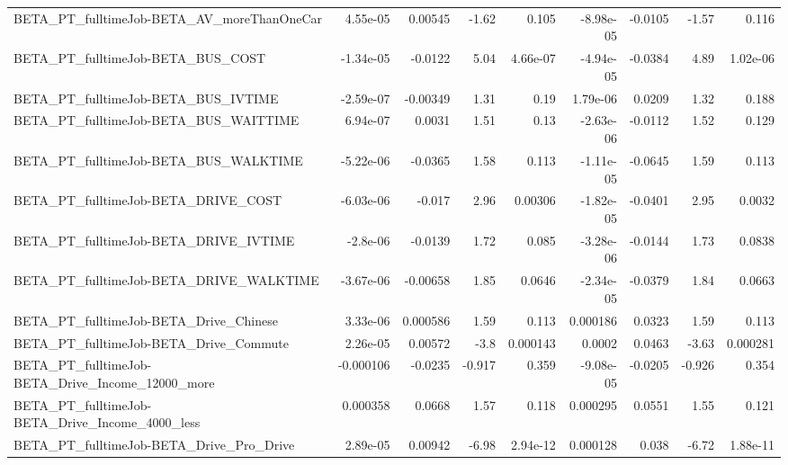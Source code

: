 \begin{tabular}{lrrrrrrrr}
BETA\_PT\_fulltimeJob-BETA\_AV\_moreThanOneCar         &    4.55e-05 &      0.00545 &     -1.62 &    0.105 &  -8.98e-05 &     -0.0105 &        -1.57 &         0.116 \\
BETA\_PT\_fulltimeJob-BETA\_BUS\_COST                  &   -1.34e-05 &      -0.0122 &      5.04 & 4.66e-07 &  -4.94e-05 &     -0.0384 &         4.89 &      1.02e-06 \\
BETA\_PT\_fulltimeJob-BETA\_BUS\_IVTIME                &   -2.59e-07 &     -0.00349 &      1.31 &     0.19 &   1.79e-06 &      0.0209 &         1.32 &         0.188 \\
BETA\_PT\_fulltimeJob-BETA\_BUS\_WAITTIME              &    6.94e-07 &       0.0031 &      1.51 &     0.13 &  -2.63e-06 &     -0.0112 &         1.52 &         0.129 \\
BETA\_PT\_fulltimeJob-BETA\_BUS\_WALKTIME              &   -5.22e-06 &      -0.0365 &      1.58 &    0.113 &  -1.11e-05 &     -0.0645 &         1.59 &         0.113 \\
BETA\_PT\_fulltimeJob-BETA\_DRIVE\_COST                &   -6.03e-06 &       -0.017 &      2.96 &  0.00306 &  -1.82e-05 &     -0.0401 &         2.95 &        0.0032 \\
BETA\_PT\_fulltimeJob-BETA\_DRIVE\_IVTIME              &    -2.8e-06 &      -0.0139 &      1.72 &    0.085 &  -3.28e-06 &     -0.0144 &         1.73 &        0.0838 \\
BETA\_PT\_fulltimeJob-BETA\_DRIVE\_WALKTIME            &   -3.67e-06 &     -0.00658 &      1.85 &   0.0646 &  -2.34e-05 &     -0.0379 &         1.84 &        0.0663 \\
BETA\_PT\_fulltimeJob-BETA\_Drive\_Chinese             &    3.33e-06 &     0.000586 &      1.59 &    0.113 &   0.000186 &      0.0323 &         1.59 &         0.113 \\
BETA\_PT\_fulltimeJob-BETA\_Drive\_Commute             &    2.26e-05 &      0.00572 &      -3.8 & 0.000143 &     0.0002 &      0.0463 &        -3.63 &      0.000281 \\
BETA\_PT\_fulltimeJob-BETA\_Drive\_Income\_12000\_more   &   -0.000106 &      -0.0235 &    -0.917 &    0.359 &  -9.08e-05 &     -0.0205 &       -0.926 &         0.354 \\
BETA\_PT\_fulltimeJob-BETA\_Drive\_Income\_4000\_less    &    0.000358 &       0.0668 &      1.57 &    0.118 &   0.000295 &      0.0551 &         1.55 &         0.121 \\
BETA\_PT\_fulltimeJob-BETA\_Drive\_Pro\_Drive           &    2.89e-05 &      0.00942 &     -6.98 & 2.94e-12 &   0.000128 &       0.038 &        -6.72 &      1.88e-11 \\

\end{tabular}
